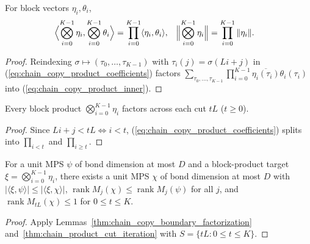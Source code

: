 \begin{lemma}
    \label{thm:chain_copy_product_inner}
    \leanok
    For block vectors $\eta_i,\theta_i$,
    \begin{align}
        \label{eq:chain_copy_product_inner}
        \Bigl\langle\bigotimes_{i=0}^{K-1}\eta_i,\bigotimes_{i=0}^{K-1}\theta_i\Bigr\rangle
         & =\prod_{i=0}^{K-1}\langle\eta_i,\theta_i\rangle, &
        \Bigl\|\bigotimes_{i=0}^{K-1}\eta_i\Bigr\|
         & =\prod_{i=0}^{K-1}\|\eta_i\|.
    \end{align}
\end{lemma}
\begin{proof}\leanok
    Reindexing $\sigma\mapsto(\tau_0,\dots,\tau_{K-1})$ with
    $\tau_i(j)=\sigma(Li+j)$ in (\ref{eq:chain_copy_product_coefficients})
    factors $\sum_{\tau_0,\dots,\tau_{K-1}}\prod_{i=0}^{K-1}\overline{\eta_i(\tau_i)}\theta_i(\tau_i)$
    into (\ref{eq:chain_copy_product_inner}).
\end{proof}

\begin{lemma}
    \label{thm:chain_copy_boundary_factorization}
    \leanok
    Every block product $\bigotimes_{i=0}^{K-1}\eta_i$ factors across each cut
    $tL$ ($t\ge0$).
\end{lemma}
\begin{proof}\leanok
    Since $Li+j<tL\iff i<t$, (\ref{eq:chain_copy_product_coefficients}) splits
    into $\prod_{i<t}$ and $\prod_{i\ge t}$.
\end{proof}

\begin{lemma}
    \label{thm:chain_copy_boundary_replacement}
    \leanok
    For a unit MPS $\psi$ of bond dimension at most $D$ and a block-product
    target $\xi=\bigotimes_{i=0}^{K-1}\eta_i$, there exists a unit MPS $\chi$
    of bond dimension at most $D$ with
    $|\langle\xi,\psi\rangle|\le|\langle\xi,\chi\rangle|$,
    $\operatorname{rank}M_j(\chi)\le\operatorname{rank}M_j(\psi)$ for all $j$,
    and $\operatorname{rank}M_{tL}(\chi)\le1$ for $0\le t\le K$.
\end{lemma}
\begin{proof}\leanok
    Apply Lemmas~\ref{thm:chain_copy_boundary_factorization}
    and~\ref{thm:chain_product_cut_iteration} with $S=\{tL:0\le t\le K\}$.
\end{proof}

